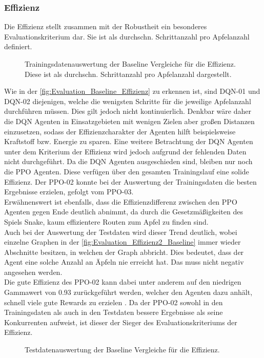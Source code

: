 \subsubsection{Effizienz} \label{sec:Evaluation_Effizienz_Baseline}
Die Effizienz stellt zusammen mit der Robustheit ein besonderes Evaluationskriterium dar. Sie ist als durchschn. Schrittanzahl pro Apfelanzahl definiert.
\begin{figure}[H]
	\centering
	
	\caption[Effizienz - Auswertung der Trainingsdaten der Baseline Vergleiche]{Trainingsdatenauswertung der Baseline Vergleiche für die Effizienz. Diese ist als durchschn. Schrittanzahl pro Apfelanzahl dargestellt.}
	\label{fig:Evaluation_Baseline_Effizienz}
\end{figure}
Wie in der \autoref{fig:Evaluation_Baseline_Effizienz} zu erkennen ist, sind DQN-01 und DQN-02 diejenigen, welche die wenigsten Schritte für die jeweilige Apfelanzahl durchführen müssen. Dies gilt jedoch nicht kontinuierlich. Denkbar wäre daher die DQN Agenten in Einsatzgebieten mit wenigen Zielen aber großen Distanzen einzusetzen, sodass der Effizienzcharakter der Agenten hilft beispielsweise Kraftstoff bzw. Energie zu sparen.
Eine weitere Betrachtung der DQN Agenten unter dem Kriterium der Effizienz wird jedoch aufgrund der fehlenden Daten nicht durchgeführt.
Da die DQN Agenten ausgeschieden sind, bleiben nur noch die PPO Agenten. Diese verfügen über den gesamten Trainingslauf eine solide Effizienz.
Der PPO-02 konnte bei der Auswertung der Trainingsdaten die besten Ergebnisse erzielen, gefolgt vom PPO-03.\\
Erwähnenswert ist ebenfalls, dass die Effizienzdifferenz zwischen den PPO Agenten gegen Ende deutlich abnimmt, da durch die Gesetzmäßigkeiten des Spiels Snake, kaum effizientere Routen zum Apfel zu finden sind.\\
Auch bei der Auswertung der Testdaten wird dieser Trend deutlich, wobei
einzelne Graphen in der \autoref{fig:Evaluation_Effizienz2_Baseline} immer wieder Abschnitte besitzen, in welchen der Graph abbricht. Dies bedeutet, dass der Agent eine solche Anzahl an Äpfeln nie erreicht hat. Das muss nicht negativ angesehen werden.\\
Die gute Effizienz des PPO-02 kann dabei unter anderem auf den niedrigen Gammawert von 0.93 zurückgeführt werden, welcher den Agenten dazu anhält, schnell viele gute Rewards zu erzielen . Da der PPO-02 sowohl in den Trainingsdaten als auch in den Testdaten bessere Ergebnisse als seine Konkurrenten aufweist, ist dieser der Sieger des Evaluationskriteriums der Effizienz.
\begin{figure}[H]
	\centering
	
	\caption[Effizienz - Auswertung der Testdaten der Baseline Vergleiche]{Testdatenauswertung der Baseline Vergleiche für die Effizienz.}
	\label{fig:Evaluation_Effizienz2_Baseline}
\end{figure}


